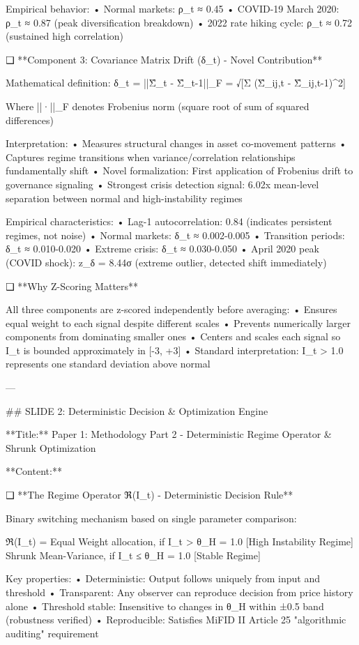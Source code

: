Empirical behavior:
   • Normal markets: ρ_t ≈ 0.45
   • COVID-19 March 2020: ρ_t ≈ 0.87 (peak diversification breakdown)
   • 2022 rate hiking cycle: ρ_t ≈ 0.72 (sustained high correlation)

❑ **Component 3: Covariance Matrix Drift (δ_t) - Novel Contribution**

Mathematical definition: δ_t = ||Σ̂_t - Σ̂_{t-1}||_F = √[Σ (Σ̂_{ij,t} - Σ̂_{ij,t-1})^2]

Where ||·||_F denotes Frobenius norm (square root of sum of squared differences)

Interpretation:
   • Measures structural changes in asset co-movement patterns
   • Captures regime transitions when variance/correlation relationships fundamentally shift
   • Novel formalization: First application of Frobenius drift to governance signaling
   • Strongest crisis detection signal: 6.02x mean-level separation between normal and high-instability regimes

Empirical characteristics:
   • Lag-1 autocorrelation: 0.84 (indicates persistent regimes, not noise)
   • Normal markets: δ_t ≈ 0.002-0.005
   • Transition periods: δ_t ≈ 0.010-0.020
   • Extreme crisis: δ_t ≈ 0.030-0.050
   • April 2020 peak (COVID shock): z_δ = 8.44σ (extreme outlier, detected shift immediately)

❑ **Why Z-Scoring Matters**

All three components are z-scored independently before averaging:
   • Ensures equal weight to each signal despite different scales
   • Prevents numerically larger components from dominating smaller ones
   • Centers and scales each signal so I_t is bounded approximately in [-3, +3]
   • Standard interpretation: I_t > 1.0 represents one standard deviation above normal

---

## SLIDE 2: Deterministic Decision & Optimization Engine

**Title:** Paper 1: Methodology Part 2 - Deterministic Regime Operator & Shrunk Optimization

**Content:**

❑ **The Regime Operator ℜ(I_t) - Deterministic Decision Rule**

Binary switching mechanism based on single parameter comparison:

ℜ(I_t) = {
   Equal Weight allocation,    if I_t > θ_H = 1.0  [High Instability Regime]
   Shrunk Mean-Variance,      if I_t ≤ θ_H = 1.0  [Stable Regime]
}

Key properties:
   • Deterministic: Output follows uniquely from input and threshold
   • Transparent: Any observer can reproduce decision from price history alone
   • Threshold stable: Insensitive to changes in θ_H within ±0.5 band (robustness verified)
   • Reproducible: Satisfies MiFID II Article 25 "algorithmic auditing" requirement

